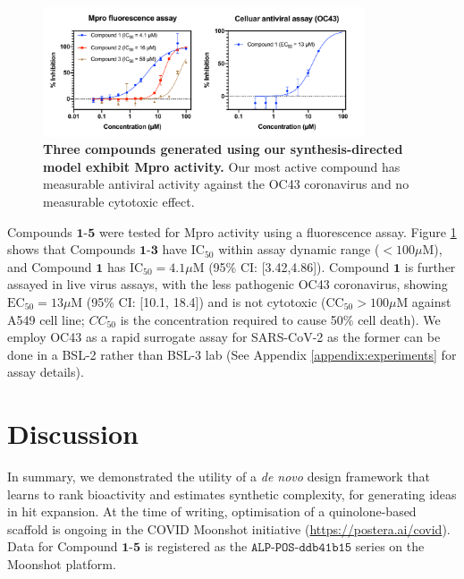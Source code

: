 \begin{figure}[!th]
    \centering
    \includegraphics[width=0.85\textwidth]{Chapters/Ranking/Figs/data_curve.pdf}
    \caption{\textbf{Three compounds generated using our synthesis-directed model exhibit Mpro activity.} Our most active compound has measurable antiviral activity against the OC43 coronavirus and no measurable cytotoxic effect.}
    \label{fig:data}
\end{figure}

Compounds $\mathbf{1}$-$\mathbf{5}$ were tested for Mpro activity using a fluorescence assay. Figure \ref{fig:data} shows that Compounds $\mathbf{1}$-$\mathbf{3}$ have $\mathrm{IC}_{50}$ within assay dynamic range ($<100 \mu$M), and Compound $\mathbf{1}$ has $\mathrm{IC}_{50} = 4.1 \mu$M (95\% CI: [3.42,4.86]). Compound $\mathbf{1}$ is further assayed in live virus assays, with the less pathogenic OC43 coronavirus, showing $\mathrm{EC}_{50} = 13 \mu$M (95\% CI: [10.1, 18.4]) and is not cytotoxic ($\mathrm{CC}_{50}>100 \mu$M against A549 cell line; $CC_{50}$ is the concentration required to cause 50\% cell death). We employ OC43 as a rapid surrogate assay for SARS-CoV-2 as the former can be done in a BSL-2 rather than BSL-3 lab (See Appendix \ref{appendix:experiments} for assay details). %

\section{Discussion} \label{sec:discussion}

In summary, we demonstrated the utility of a \emph{de novo} design framework that learns to rank bioactivity and estimates synthetic complexity, for generating ideas in hit expansion. At the time of writing, optimisation of a quinolone-based scaffold is ongoing in the COVID Moonshot initiative (\url{https://postera.ai/covid}). Data for Compound $\mathbf{1}$-$\mathbf{5}$ is registered as the $\texttt{ALP-POS-ddb41b15}$ series on the Moonshot platform. 

